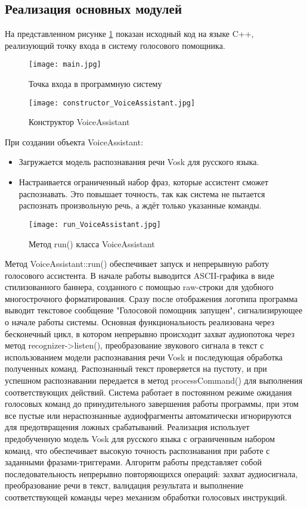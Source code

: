 \subsection{Реализация основных модулей}

На представленном рисунке \ref{fig:main.cpp} показан исходный код на языке C++, реализующий точку входа в систему голосового помощника.
\begin{figure}[H]
	\centering
	\texttt{[image: main.jpg]}
	\caption{Точка входа в программную систему}
	\label{fig:main.cpp}
\end{figure}

\begin{figure}[H]
	\centering
	\texttt{[image: constructor\_VoiceAssistant.jpg]}
	\caption{Конструктор VoiceAssistant}
\end{figure}

При создании объекта VoiceAssistant:
\begin{itemize}
 	\item Загружается модель распознавания речи Vosk для русского языка.

	\item Настраивается ограниченный набор фраз, которые ассистент сможет распознавать. Это повышает точность, так как система не пытается распознать произвольную речь, а ждёт только указанные команды.
\end{itemize}

\begin{figure}[H]
	\centering
	\texttt{[image: run\_VoiceAssistant.jpg]}
	\caption{Метод run() класса VoiceAssistant}
\end{figure}

Метод VoiceAssistant::run() обеспечивает запуск и непрерывную работу голосового ассистента. В начале работы выводится ASCII-графика в виде стилизованного баннера, созданного с помощью raw-строки для удобного многострочного форматирования. Сразу после отображения логотипа программа выводит текстовое сообщение "Голосовой помощник запущен", сигнализирующее о начале работы системы. Основная функциональность реализована через бесконечный цикл, в котором непрерывно происходит захват аудиопотока через метод recognizer->listen(), преобразование звукового сигнала в текст с использованием модели распознавания речи Vosk и последующая обработка полученных команд. Распознанный текст проверяется на пустоту, и при успешном распознавании передается в метод processCommand() для выполнения соответствующих действий. Система работает в постоянном режиме ожидания голосовых команд до принудительного завершения работы программы, при этом все пустые или нераспознанные аудиофрагменты автоматически игнорируются для предотвращения ложных срабатываний. Реализация использует предобученную модель Vosk для русского языка с ограниченным набором команд, что обеспечивает высокую точность распознавания при работе с заданными фразами-триггерами. Алгоритм работы представляет собой последовательность непрерывно повторяющихся операций: захват аудиосигнала, преобразование речи в текст, валидация результата и выполнение соответствующей команды через механизм обработки голосовых инструкций.

